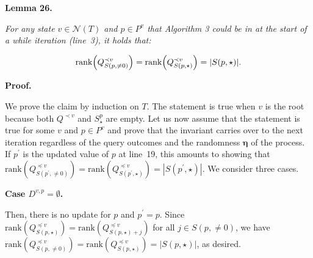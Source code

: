 

\par\medskip\noindent\textbf{
\textbf{Lemma 26}\textbf{.}
}\par



\emph{For any state $v\in\mathcal{N}(T)$ and $p\in P^{v}$ that Algorithm 3 could be in at the start of a while iteration (line 3), it holds that:}\par


\[\begin{gathered}
\mathrm{rank}\Big{(}Q^{\prec v}_{S(p,\neq 0)}\Big{)}=\mathrm{rank}\Big{(}Q^{\prec v}_{S(p,\star)}\Big{)}=|S(p,\star)|.
\end{gathered}\]






\par\medskip\noindent\textbf{Proof.}\par




We prove the claim by induction on $T$. The statement is true when $v$ is the root because both $Q^{\prec v}$ and $S^{p}_{\star}$ are empty. Let us now assume that the statement is true for some $v$ and $p\in P^{v}$ and prove that the invariant carries over to the next iteration regardless of the query outcomes and the randomness $\bm{\eta}$ of the process. If $p^{\prime}$ is the updated value of $p$ at line 19, this amounts to showing that $\mathrm{rank}(Q^{\preceq v}_{S(p^{\prime},\neq 0)})=\mathrm{rank}(Q^{\preceq v}_{S(p^{\prime},\star)})=|S(p^{\prime},\star)|$. We consider three cases.\par





\par\medskip\noindent\textbf{Case $D^{v,p}=\emptyset$.}\par




Then, there is no update for $p$ and $p^{\prime}=p$. Since $\mathrm{rank}(Q^{\preceq v}_{S(p,\star)})=\mathrm{rank}(Q^{\preceq v}_{S(p,\star)+j})$ for all $j\in S(p,\neq 0)$, we have $\mathrm{rank}(Q^{\preceq v}_{S(p,\neq 0)})=\mathrm{rank}(Q^{\preceq v}_{S(p,\star)})=|S(p,\star)|$, as desired.\par





